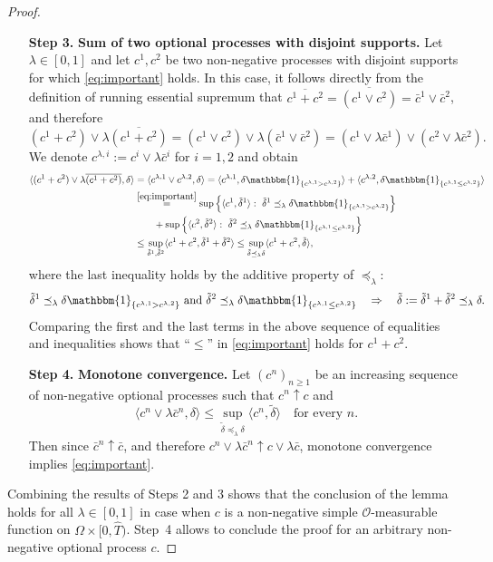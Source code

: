 \documentclass[11pt, oneside]{article}   	%
\theoremstyle{plain}
\theoremstyle{definition}
\theoremstyle{remark}
\begin{document}
\begin{proof}
\begin{enumerate}
\item[\textbf{Step 3.}] \textbf{Sum of two optional processes with disjoint supports.} Let $\lambda\in[0,1]$ and let $c^1,c^2$ be two non-negative processes with disjoint supports for which \eqref{eq:important} holds. In this case, it follows directly from the definition of running essential supremum that $\overline{c^1+c^2}=\overline{(c^1\vee c^2)}=\bar{c}^1\vee\bar{c}^2$, and therefore
$$(c^1+c^2)\vee\lambda\overline{(c^1+c^2)}=(c^1\vee c^2)\vee\lambda(\bar{c}^1\vee\bar{c}^2)=(c^1\vee\lambda\bar{c}^1)\vee(c^2\vee\lambda\bar{c}^2).$$
We denote $c^{\lambda,i}:=c^i\vee\lambda\bar{c}^i$ for $i=1,2$ and obtain
\begin{equation*}
\begin{aligned}
\langle(c^1+c^2)\vee\lambda\overline{(c^1+c^2)},\delta\rangle&=\langle c^{\lambda,1}\vee c^{\lambda,2},\delta \rangle=\langle c^{\lambda,1},\delta\mathbbm{1}_{\{c^{\lambda,1}>c^{\lambda,2}\}} \rangle+\langle c^{\lambda,2},\delta\mathbbm{1}_{\{c^{\lambda,1}\leq c^{\lambda,2}\}} \rangle\\
&\overset{\eqref{eq:important}}{=}\sup\left\{\langle c^1,\tilde\delta^1 \rangle:\ \tilde\delta^1\preceq_\lambda \delta\mathbbm{1}_{\left\{c^{\lambda,1}>c^{\lambda,2}\right\}}\right\}\\
&\quad\quad+\sup\left\{\langle c^2,\tilde\delta^2 \rangle:\ \tilde\delta^2\preceq_\lambda \delta\mathbbm{1}_{\left\{c^{\lambda,1}\leq c^{\lambda,2}\right\}}\right\}\\
&\leq\sup_{\tilde\delta^1,\tilde\delta^2}\langle c^1+c^2,\tilde\delta^1+\tilde\delta^2\rangle \leq\sup_{\tilde\delta\preceq_\lambda\delta}\langle c^1+c^2,\tilde\delta \rangle,
\end{aligned}
\end{equation*}
where the last inequality holds by the additive property of $\preceq_\lambda$:
$$\tilde\delta^1\preceq_\lambda \delta\mathbbm{1}_{\left\{c^{\lambda,1}>c^{\lambda,2}\right\}}\text{ and }\tilde\delta^2\preceq_\lambda \delta\mathbbm{1}_{\left\{c^{\lambda,1}\leq c^{\lambda,2}\right\}}\quad\Rightarrow\quad \tilde\delta:=\tilde\delta^1+\tilde\delta^2\preceq_\lambda \delta.$$
Comparing the first and the last terms in the above sequence of equalities and inequalities shows that ``$\leq$'' in \eqref{eq:important} holds for $c^1+c^2$.
\item[\textbf{Step 4.}] \textbf{Monotone convergence.} Let $(c^n)_{n\geq1}$ be an increasing sequence of non-negative optional processes such that $c^n\uparrow c$ and
$$\langle c^n\vee\lambda\bar{c}^n,\delta \rangle\leq\sup_{\tilde{\delta}\preceq_\lambda \delta}\langle c^n,\tilde{\delta}\rangle\quad \text{for every } n.$$
Then since $\bar{c}^n\uparrow \bar{c}$, and therefore $c^n\vee\lambda\bar{c}^n\uparrow c\vee\lambda\bar{c}$, monotone convergence implies \eqref{eq:important}.
\end{enumerate}
Combining the results of Steps 2 and 3 shows that the conclusion of the lemma holds for all $\lambda\in[0,1]$ in case when $c$ is a non-negative simple $\mathcal{O}$-measurable function on $\Omega\times[0,\hat{T})$. Step~4 allows to conclude the proof for an arbitrary non-negative optional process $c$.
\end{proof}
\end{document}
